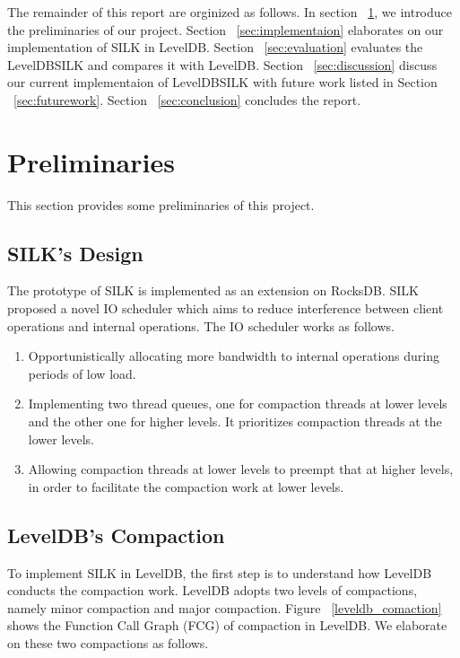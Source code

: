 \documentclass[letter,twocolumn,10pt]{article}
\begin{document}
The remainder of this report are orginized as follows. In section ~\ref{sec:preliminary}, we introduce the preliminaries of our project. Section ~\ref{sec:implementaion} elaborates on our implementation of SILK in LevelDB. Section ~\ref{sec:evaluation} evaluates the LevelDBSILK and compares it with LevelDB. Section ~\ref{sec:discussion} discuss our current implementaion of LevelDBSILK with future work listed in Section ~\ref{sec:futurework}. Section ~\ref{sec:conclusion} concludes the report.
\section{Preliminaries}
\label{sec:preliminary}
This section provides some preliminaries of this project.

\subsection {SILK's Design}
\label{sec:ioscheduler}
The prototype of SILK is implemented as an extension on RocksDB. SILK proposed a novel IO scheduler which aims to reduce interference between client operations and internal operations. The IO scheduler works as follows.
\begin{enumerate}
\item Opportunistically allocating more bandwidth to internal operations during periods of low load.
\item Implementing two thread queues, one for compaction threads at lower levels and the other one for higher levels. It prioritizes compaction threads at the lower levels.
\item Allowing compaction threads at lower levels to preempt that at higher levels, in order to facilitate the compaction work at lower levels.
\end{enumerate}

\subsection {LevelDB's Compaction}
\label{sec:leveldbcom}
To implement SILK in LevelDB, the first step is to understand how LevelDB conducts the compaction work. LevelDB adopts two levels of compactions, namely minor compaction and major compaction. Figure ~\ref{leveldb_comaction} shows the Function Call Graph (FCG) of compaction in LevelDB. We elaborate on these two compactions as follows.
\end{document}
